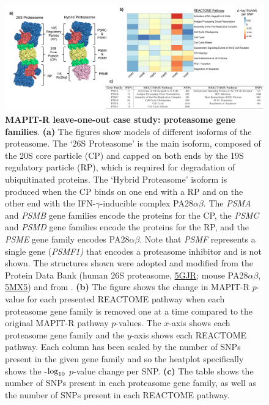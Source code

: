 \documentclass[12pt,a4paper]{article}
\def\log{{\rm log}}
\begin{document}
\begin{figure}[htbp]
\centering
\hspace*{-2.5cm}
\includegraphics[scale=.55]{Images/Main/InterPath_Main_Figure_Proteasome_vs2.png}
\caption[TBD]{\textbf{MAPIT-R leave-one-out case study: proteasome gene families}. \textbf{(a)} The figures show models of different isoforms of the proteasome. The `26S Proteasome' is the main isoform, composed of the 20S core particle (CP) and capped on both ends by  the 19S regulatory particle (RP), which is required for degradation of ubiquitinated proteins. The `Hybrid Proteasome' isoform is produced when the CP binds on one end with a RP and on the other end with the IFN-$\gamma$-inducible complex PA28$\alpha\beta$. The \textit{PSMA} and \textit{PSMB} gene families encode the proteins for the CP, the \textit{PSMC} and \textit{PSMD} gene families encode the proteins for the RP, and the \textit{PSME} gene family encodes PA28$\alpha\beta$. Note that \textit{PSMF} represents a single gene (\textit{PSMF1)} that encodes a proteasome inhibitor and is not shown. The structures shown were adopted and modified from the Protein Data Bank (human 26S proteasome, \href{https://www.rcsb.org/structure/5GJR}{5GJR}; mouse PA28$\alpha\beta$, \href{https://www.rcsb.org/structure/5MX5}{5MX5}) and from \citet{Murata2018}. \textbf{(b)} The figure shows the change in MAPIT-R $p$-value for each presented REACTOME pathway when each proteasome gene family is removed one at a time compared to the original MAPIT-R pathway $p$-values. The $x$-axis shows each proteasome gene family and the $y$-axis shows each REACTOME pathway. Each column has been scaled by the number of SNPs present in the given gene family and so the heatplot specifically shows the -$\log_{10}$ $p$-value change per SNP. \textbf{(c)} The table shows the number of SNPs present in each proteasome gene family, as well as the number of SNPs present in each REACTOME pathway.}
\label{InterPath-Main-Figure-Proteasome-Panels}
\end{figure}
\end{document}
